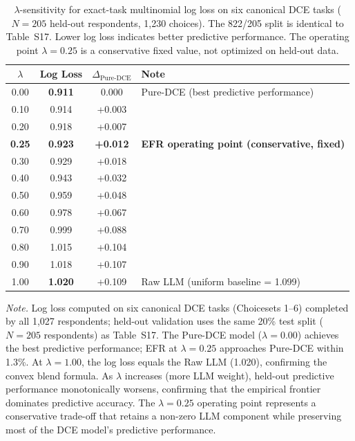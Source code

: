
\begin{table}[h]
\centering
\caption{$\lambda$-sensitivity for exact-task multinomial log loss on six canonical DCE tasks ($N = 205$ held-out respondents, 1,230 choices). The 822/205 split is identical to Table~S17. Lower log loss indicates better predictive performance. The operating point $\lambda = 0.25$ is a conservative fixed value, not optimized on held-out data.}
\label{tab:lambda_sensitivity_exact_task}
\footnotesize
\begin{tabular}{c c c l}
\toprule
$\lambda$ & Log Loss & $\Delta_{\text{Pure-DCE}}$ & Note \\
\midrule
0.00 & \textbf{0.911} & 0.000 & Pure-DCE (best predictive performance) \\
0.10 & 0.914 & +0.003 &  \\
0.20 & 0.918 & +0.007 &  \\
\textbf{0.25} & \textbf{0.923} & \textbf{+0.012} & \textbf{EFR operating point (conservative, fixed)} \\
0.30 & 0.929 & +0.018 &  \\
0.40 & 0.943 & +0.032 &  \\
0.50 & 0.959 & +0.048 &  \\
0.60 & 0.978 & +0.067 &  \\
0.70 & 0.999 & +0.088 &  \\
0.80 & 1.015 & +0.104 &  \\
0.90 & 1.018 & +0.107 &  \\
1.00 & \textbf{1.020} & +0.109 & Raw LLM (uniform baseline = 1.099) \\
\bottomrule
\end{tabular}

\vspace{0.5em}
\begin{minipage}{0.95\textwidth}
\small
\textit{Note.} Log loss computed on six canonical DCE tasks (Choicesets 1--6) completed by all 1,027 respondents; held-out validation uses the same 20\% test split ($N = 205$ respondents) as Table~S17. The Pure-DCE model ($\lambda = 0.00$) achieves the best predictive performance; EFR at $\lambda = 0.25$ approaches Pure-DCE within 1.3\%. At $\lambda = 1.00$, the log loss equals the Raw LLM (1.020), confirming the convex blend formula. As $\lambda$ increases (more LLM weight), held-out predictive performance monotonically worsens, confirming that the empirical frontier dominates predictive accuracy. The $\lambda = 0.25$ operating point represents a conservative trade-off that retains a non-zero LLM component while preserving most of the DCE model's predictive performance.
\end{minipage}
\end{table}


